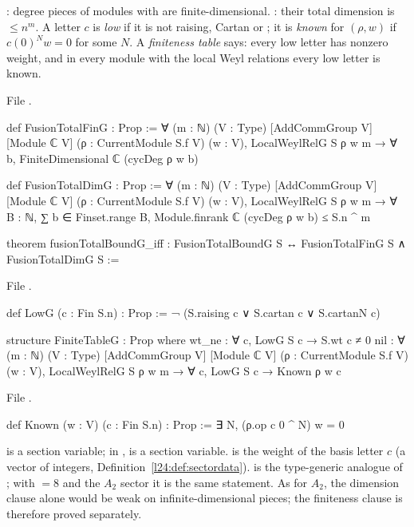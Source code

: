 \begin{definition}\label{l26:def:finG}
: degree pieces of modules with  are finite-dimensional.
: their total dimension is $\le n^m$. A letter $c$ is \emph{low} if it is not raising, Cartan or
; it is \emph{known} for $(\rho,w)$ if $c(0)^Nw=0$ for some $N$. A \emph{finiteness table} says: every low letter has
nonzero weight, and in every module with the local Weyl relations every low letter is known.
\end{definition}
\noindent File .
\begin{leancode}
def FusionTotalFinG : Prop :=
  ∀ (m : ℕ) (V : Type) [AddCommGroup V] [Module ℂ V] (ρ : CurrentModule S.f V) (w : V),
    LocalWeylRelG S ρ w m → ∀ b, FiniteDimensional ℂ (cycDeg ρ w b)

def FusionTotalDimG : Prop :=
  ∀ (m : ℕ) (V : Type) [AddCommGroup V] [Module ℂ V] (ρ : CurrentModule S.f V) (w : V),
    LocalWeylRelG S ρ w m → ∀ B : ℕ, ∑ b ∈ Finset.range B, Module.finrank ℂ (cycDeg ρ w b) ≤ S.n ^ m

theorem fusionTotalBoundG_iff : FusionTotalBoundG S ↔ FusionTotalFinG S ∧ FusionTotalDimG S :=
\end{leancode}
\noindent File .
\begin{leancode}
def LowG (c : Fin S.n) : Prop := ¬ (S.raising c ∨ S.cartan c ∨ S.cartanN c)

structure FiniteTableG : Prop where
  wt_ne : ∀ c, LowG S c → S.wt c ≠ 0
  nil : ∀ (m : ℕ) (V : Type) [AddCommGroup V] [Module ℂ V] (ρ : CurrentModule S.f V) (w : V),
    LocalWeylRelG S ρ w m → ∀ c, LowG S c → Known ρ w c
\end{leancode}
\noindent File .
\begin{leancode}
def Known (w : V) (c : Fin S.n) : Prop := ∃ N, (ρ.op c 0 ^ N) w = 0
\end{leancode}

\begin{dictionary}
 is a section variable; in ,  is a section variable.  is the weight of the basis letter $c$
(a vector of integers, Definition~\ref{l24:def:sectordata}).  is the type-generic analogue of
; with  $=8$ and the $A_2$ sector it is the same statement. As for $A_2$, the dimension clause
alone would be weak on infinite-dimensional pieces; the finiteness clause is therefore proved separately.
\end{dictionary}

